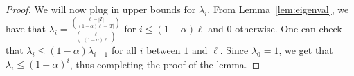 \documentclass[11pt]{article}
\theoremstyle{definition}
\begin{document}
\begin{proof}
We will now plug in upper bounds for $\lambda_i$. From Lemma~\ref{lem:eigenval}, we have that $\lambda_i = \frac{\binom{\ell - |T|}{(1 - \alpha)\ell - |T|}}{\binom{\ell}{(1 - \alpha)\ell}}$ for $i \leq (1-\alpha)\ell$ and $0$ otherwise. One can check that ${\lambda_i \leq (1-\alpha)\lambda_{i-1}}$ for all $i$ between $1$ and $\ell$. Since $\lambda_0 = 1$, we get that $\lambda_i \leq (1-\alpha)^i$, thus completing the proof of the lemma.

\end{proof}

\newcommand{\etalchar}[1]{$^{#1}$}
\providecommand{\bysame}{\leavevmode\hbox to3em{\hrulefill}\thinspace}
\providecommand{\MR}{\relax\ifhmode\unskip\space\fi MR }
\providecommand{\MRhref}[2]{%
  \href{http://www.ams.org/mathscinet-getitem?mr=#1}{#2}
}
\providecommand{\href}[2]{#2}
\end{document}
